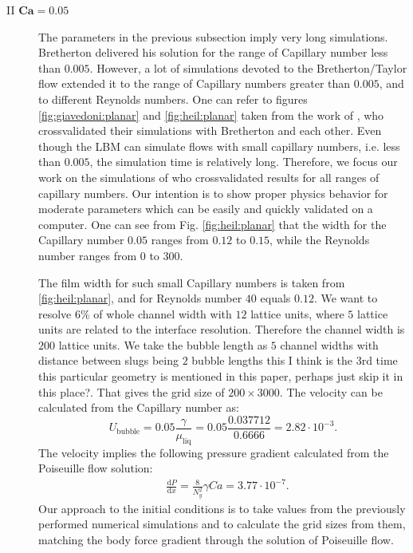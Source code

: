 \documentclass{article}
\newcommand{\todo}[1]{{\color{red}#1}}
\begin{document}
\begin{description}
 \item[II $\bm{Ca=0.05}$] 
   The parameters in the previous subsection imply very long
simulations. Bretherton delivered his solution for the range of Capillary number
less than
  $0.005$. However, a lot of simulations devoted to the Bretherton/Taylor
flow extended it to the range of Capillary numbers greater than
$0.005$, and to different Reynolds numbers. One can refer to figures
  \ref{fig:giavedoni:planar} and \ref{fig:heil:planar} taken from the work of
  \citet{giavedoni-numerical,heil-bretherton}, who crossvalidated their
  simulations with Bretherton and each other. Even though the LBM can simulate
flows with small capillary numbers, i.e. less than $0.005$, the simulation time
is relatively long. Therefore, we focus our work on the simulations of
\citet{giavedoni-numerical} who crossvalidated
results for all ranges of capillary numbers.  Our intention is
  to show proper physics behavior for moderate parameters
which
  can be easily and quickly validated on a computer.
  One can see from Fig. \ref{fig:heil:planar} that the width for the
  Capillary number $0.05$ ranges from $0.12$ to $0.15$, while the Reynolds
  number ranges from $0$ to $300$.

  The film width for such small Capillary numbers is taken from
  \ref{fig:heil:planar}, and for Reynolds number $40$ equals $0.12$. We want to
  resolve $6\%$ of whole channel width with $12$ lattice units, where $5$
lattice units are related to the interface resolution.  Therefore the channel
  width is $200$ lattice units. We take the bubble length as $5$ channel widths
  with distance between slugs being $2$ bubble lengths \todo{this I think is the 3rd
  time this particular geometry is mentioned in this paper, perhaps just skip it in this place?}. That gives
the grid size of $200 \times 3000$. The velocity can be
calculated from the Capillary number as:
  \begin{equation}
  U_{\mathrm{bubble}}=0.05 \frac{\gamma}{\mu_{\mathrm{liq}}}=0.05 \frac{0.037712}{0.6666}=2.82\cdot
  10^{-3}.
  \end{equation}
  The velocity implies the following pressure gradient calculated from the
  Poiseuille flow solution:
  \begin{equation}
  \begin{aligned}
  &\frac{\mathrm{d}P}{\mathrm{d}x}=\frac{8}{N_y^2}\gamma Ca=3.77\cdot10^{-7}.
  \end{aligned}
  \end{equation}
  Our approach to the initial conditions is  to take values from the previously performed
numerical simulations and to calculate the grid sizes from them, matching the
body force gradient through the solution of Poiseuille flow.

\end{description}
\end{document}
